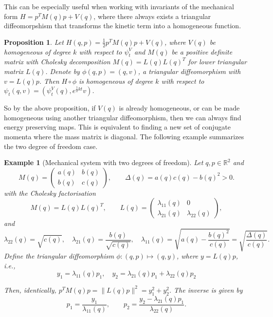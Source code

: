 \documentclass[final,3p,times]{elsarticle}
\newtheorem{example}[theorem]{Example}
\newtheorem{proposition}[theorem]{Proposition}
\newcommand{\R}{\mathbb{R}}
\begin{document}
This can be especially useful when working with invariants of the mechanical form $H = p^TM(q)p + V(q)$, where there always exists a triangular diffeomorpshism that transforms the kinetic term into a homogeneous function. 

\begin{proposition}
  Let  $H(q, p) = \tfrac{1}{2}p^TM(q)p + V(q)$, where $V(q)$ be homogeneous of degree $k$ with respect to $\psi^V_t$ and $M(q)$ be a positive definite matrix with Cholesky decomposition $M(q)=L(q)L(q)^T$ for lower triangular matrix $L(q)$. Denote by $\phi(q,p) = (q, v)$, a triangular diffeomorphism with $v=L(q)p$. Then $H\circ\phi$ is homogeneous of degree $k$ with respect to $\psi_t(q, v) = (\psi^{V}_t (q), e^{\tfrac{1}{2}kt}v)$.
\end{proposition}
So by the above proposition, if $V(q)$ is already homogeneous, or can be made homogeneous using another triangular diffeomorphism, then we can always find energy preserving maps. This is equivalent to finding a new set of conjugate momenta where the mass matrix is diagonal. The following example summarizes the two degree of freedom case.
 
\begin{example}[Mechanical system with two degrees of freedom]\label{eg:2d mechanical triangular map} Let $q, p\in\R^2$ and 
  $$M(q)=\begin{pmatrix}a(q)&b(q)\\[2pt]b(q)&c(q)\end{pmatrix},\qquad
\Delta(q)=a(q)c(q)-b(q)^2 > 0.$$
with the Cholesky factorisation
$$M(q)=L(q) L(q)^T,\qquad
L(q)=\begin{pmatrix}
\lambda_{11}(q) & 0\\[4pt]
\lambda_{21}(q) & \lambda_{22}(q)
\end{pmatrix},$$
and 
$$\lambda_{22}(q)=\sqrt{c(q)},\quad
\lambda_{21}(q)=\frac{b(q)}{\sqrt{c(q)}},\quad
\lambda_{11}(q)=\sqrt{a(q)-\frac{b(q)^2}{c(q)}}=\sqrt{\frac{\Delta(q)}{c(q)}}.$$
Define the triangular diffeomorphism $\phi:(q,p)\mapsto (q, y)$, where $y=L(q)p$, i.e., 
$$y_1 = \lambda_{11}(q)p_1,\quad y_2 = \lambda_{21}(q)p_1+\lambda_{22}(q)p_2$$

Then, identically, $p^{T}M(q)p = \|L(q)p\|^2 = y_1^2+y_2^2$. The inverse is given by
$$p_1=\frac{y_1}{\lambda_{11}(q)},\qquad
p_2=\frac{y_2-\lambda_{21}(q)p_1}{\lambda_{22}(q)}.
$$
\end{example}
\end{document}
